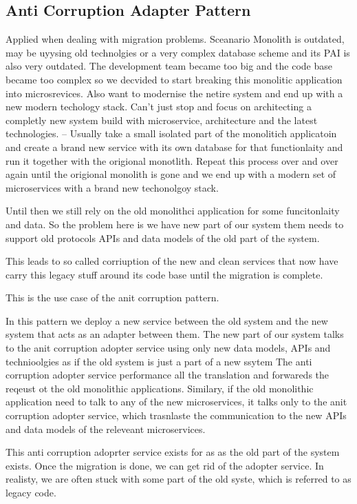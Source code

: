 \documentclass[a4paper, 11pt]{book}
\begin{document}
    \subsection{Anti Corruption Adapter Pattern}
    Applied when dealing with migration problems.
    Sceanario
    Monolith is outdated, may be uyysing old technolgies or a very complex database scheme and its PAI is also very outdated.
    The development team became too big and the code base became too complex so we decvided to start breaking this monolitic application into microsrevices.
    Also want to modernise the netire system and end up with a new modern techology stack.
    Can't just stop and focus on architecting a completly new system build with microservice, architecture and the latest technologies.
    -- Usually take a small isolated part of the monolitich applicatoin and create a brand new service with its own database for that functionlaity and run it together with the origional monotlith.
    Repeat this process over and over again until the origional monolith is gone and we end up with a modern set of microservices with a brand new techonolgoy stack.

    Until then we still rely on the old monolithci application for some funcitonlaity and data.
    So the problem here is we have new part of our system them needs to support old protocols APIs and data models of the old part of the system.

    This leads to so called corriuption of the new and clean services that now have carry this legacy stuff around its code base until the migration is complete.

    This is the use case of the anit corruption pattern.

    In this pattern we deploy a new service between the old system and the new system that acts as an adapter between them.
    The new part of our system talks to the anit corruption adopter service using only new data models, APIs and technioolgies as if the old system is just a part of a new ssytem
    The anti corruption adopter service performance all the translation and forwareds the reqeust ot the old monolithic applications.
    Similary, if the old monolithic application need to talk to any of the new microservices, it talks only to the anit corruption adopter service, which trasnlaste the communication to the new APIs and data models of the releveant microservices.

    This anti corruption adoprter service exists for as as the old part of the system exists.
    Once the migration is done, we can get rid of the adopter service.
    In realisty, we are often stuck with some part of the old syste, which is referred to as legacy code.
\end{document}

